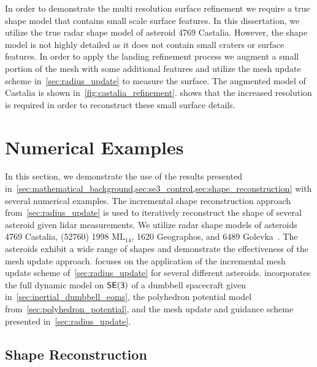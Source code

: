 \documentclass[letterpaper, paper,11pt]{AAS}		%
\begin{document}
In order to demonstrate the multi resolution surface refinement we require a true shape model that contains small scale surface features.
In this dissertation, we utilize the true radar shape model of asteroid 4769 Castalia.
However, the shape model is not highly detailed as it does not contain small craters or surface features.
In order to apply the landing refinement process we augment a small portion of the mesh with some additional features and utilize the mesh update scheme in~\cref{sec:radius_update} to measure the surface.
The augmented model of Castalia is shown in~\cref{fig:castalia_refinement}.
 shows that the increased resolution is required in order to reconstruct these small surface details.


\section{Numerical Examples}\label{sec:reconstruction_examples}

In this section, we demonstrate the use of the results presented in~\cref{sec:mathematical_background,sec:se3_control,sec:shape_reconstruction} with several numerical examples.
The incremental shape reconstruction approach from~\cref{sec:radius_update} is used to iteratively reconstruct the shape of several asteroid given \gls{lidar} measurements.
We utilize radar shape models of asteroids \num{4769} Castalia, (\num{52760}) \num{1998} \(\text{ML}_{14}\), \num{1620} Geographos, and 6489 Golevka~\cite{neese2004}.
The asteroids exhibit a wide range of shapes and demonstrate the effectiveness of the mesh update approach.
 focuses on the application of the incremental mesh update scheme of~\cref{sec:radius_update} for several different asteroids.
 incorporates the full dynamic model on \( \mathsf{SE(3)} \) of a dumbbell spacecraft given in~\cref{sec:inertial_dumbbell_eoms}, the polyhedron potential model from~\cref{sec:polyhedron_potential}, and the mesh update and guidance scheme presented in~\cref{sec:radius_update}.

\subsection{Shape Reconstruction}\label{sec:kinematic_exploration}
\end{document}
